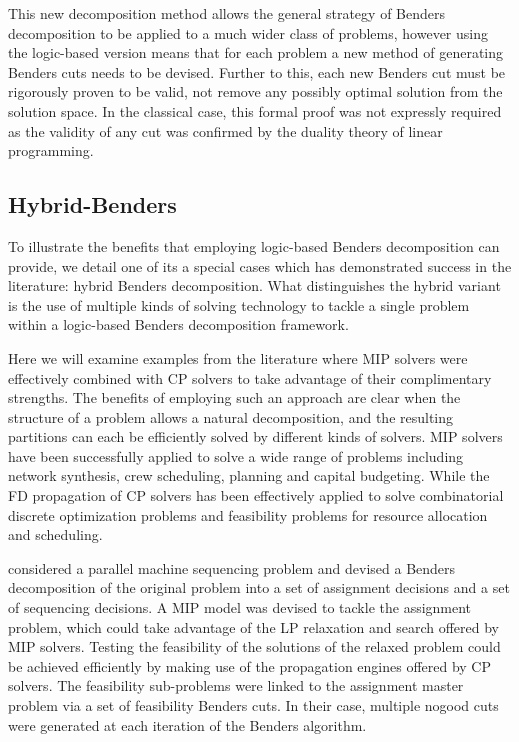 This new decomposition method allows the general strategy
of Benders decomposition to be applied to a much wider class
of problems, however using the logic-based version
means that for each problem a new method of generating Benders
cuts needs to be devised.
Further to this, each new Benders cut must be rigorously 
proven to be valid, \ie not remove any possibly optimal
solution from the solution space.
In the classical case, this formal proof was not
expressly required as the validity of any cut was
confirmed by the duality theory of linear programming.

\subsection{Hybrid-Benders}
\label{sec:lit:hybridBend}
To illustrate the benefits that employing logic-based Benders decomposition
can provide, we detail one of its a special cases which has demonstrated success in
the literature: hybrid Benders decomposition.
What distinguishes the hybrid variant
is the use of multiple kinds of solving technology
to tackle a single problem
within a logic-based Benders decomposition framework.

Here we will examine examples from the literature
where MIP solvers were effectively combined with CP solvers
to take advantage of their complimentary strengths.
The benefits of employing such an approach are clear when the
structure of a problem allows a natural decomposition,
and the resulting partitions can each be efficiently
solved by different kinds of solvers.
MIP solvers have been successfully applied to solve a wide
range of problems including network synthesis,
crew scheduling, planning and capital budgeting.
While the FD propagation of CP solvers has been effectively
applied to solve combinatorial discrete optimization problems
and feasibility problems for resource allocation and scheduling.

 considered a parallel machine sequencing problem
and devised a Benders decomposition of the original problem into a set of assignment decisions
and a set of sequencing decisions.
A MIP model was devised to tackle the assignment problem, 
which could take advantage of the LP relaxation and
\bab search offered by MIP solvers.
Testing the feasibility of the solutions of the relaxed problem
could be achieved efficiently by making use of the propagation
engines offered by CP solvers.
The feasibility sub-problems were linked to the assignment master problem
via a set of feasibility Benders cuts.
In their case, multiple nogood cuts were generated
at each iteration of the Benders algorithm.

